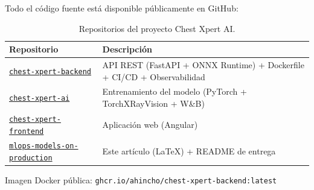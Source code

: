 Todo el c\'odigo fuente est\'a disponible p\'ublicamente en GitHub:

\begin{table}[H]
\centering
\caption{Repositorios del proyecto Chest Xpert AI.}
\label{tab:repos}
\small
\begin{tabularx}{\textwidth}{lX}
\toprule
\textbf{Repositorio} & \textbf{Descripci\'on} \\
\midrule
\href{https://github.com/ahincho/chest-xpert-backend}{\texttt{chest-xpert-backend}} & API REST (FastAPI + ONNX Runtime) + Dockerfile + CI/CD + Observabilidad \\
\href{https://github.com/ahincho/chest-xpert-ai}{\texttt{chest-xpert-ai}} & Entrenamiento del modelo (PyTorch + TorchXRayVision + W\&B) \\
\href{https://github.com/ahincho/chest-xpert-frontend}{\texttt{chest-xpert-frontend}} & Aplicaci\'on web (Angular) \\
\href{https://github.com/ahincho/mlops-models-on-production}{\texttt{mlops-models-on-production}} & Este art\'iculo (LaTeX) + README de entrega \\
\bottomrule
\end{tabularx}
\end{table}

\noindent
Imagen Docker p\'ublica: \texttt{ghcr.io/ahincho/chest-xpert-backend:latest}
